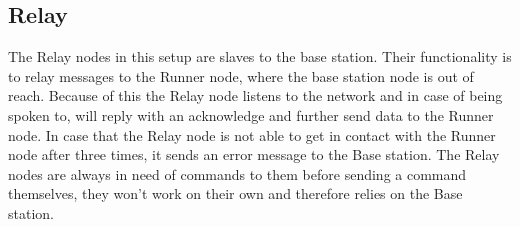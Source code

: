 \subsection{Relay}\label{sc:relay}
The Relay nodes in this setup are slaves to the base station. Their functionality is to relay messages to the Runner node, where the base station node is out of reach. Because of this the Relay node listens to the network and in case of being spoken to, will reply with an acknowledge and further send data to the Runner node. In case that the Relay node is not able to get in contact with the Runner node after three times, it sends an error message to the Base station. The Relay nodes are always in need of commands to them before sending a command themselves, they won't work on their own and therefore relies on the Base station.